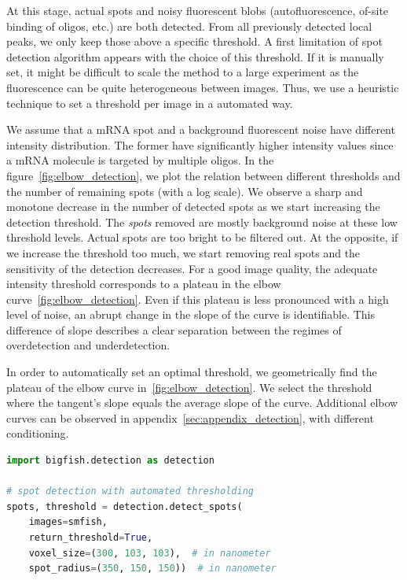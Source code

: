At this stage, actual spots and noisy fluorescent blobs (autofluorescence, of-site binding of oligos, etc.) are both detected.
From all previously detected local peaks, we only keep those above a specific threshold.
A first limitation of spot detection algorithm appears with the choice of this threshold.
If it is manually set, it might be difficult to scale the method to a large experiment as the fluorescence can be quite heterogeneous between images.
Thus, we use a heuristic technique to set a threshold per image in a automated way.

We assume that a \ac{mRNA} spot and a background fluorescent noise have different intensity distribution.
The former have significantly higher intensity values since a \ac{mRNA} molecule is targeted by multiple oligos.
In the figure~\ref{fig:elbow_detection}, we plot the relation between different thresholds and the number of remaining spots (with a log scale).
We observe a sharp and monotone decrease in the number of detected spots as we start increasing the detection threshold.
The \emph{spots} removed are mostly background noise at these low threshold levels.
Actual spots are too bright to be filtered out.
At the opposite, if we increase the threshold too much, we start removing real spots and the sensitivity of the detection decreases.
For a good image quality, the adequate intensity threshold corresponds to a plateau in the elbow curve~\ref{fig:elbow_detection}.
Even if this plateau is less pronounced with a high level of noise, an abrupt change in the slope of the curve is identifiable.
This difference of slope describes a clear separation between the regimes of overdetection and underdetection.

In order to automatically set an optimal threshold, we geometrically find the plateau of the elbow curve in~\ref{fig:elbow_detection}.
We select the threshold where the tangent's slope equals the average slope of the curve.
Additional elbow curves can be observed in appendix~\ref{sec:appendix_detection}, with different conditioning.\\

\begin{minipage}{0.9\textwidth}
\begin{lstlisting}[language=Python]
import bigfish.detection as detection

# spot detection with automated thresholding
spots, threshold = detection.detect_spots(
    images=smfish,
    return_threshold=True,
    voxel_size=(300, 103, 103),  # in nanometer
    spot_radius=(350, 150, 150))  # in nanometer
\end{lstlisting}
\end{minipage}

